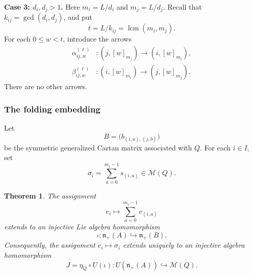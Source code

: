 \documentclass[12pt,reqno]{amsart}
\numberwithin{equation}{section}
\newtheorem{theorem}{Theorem}[section]
\theoremstyle{definition}
\theoremstyle{remark}
\newcommand{\lcm}{\operatorname{lcm}}
\theoremstyle{plain}
\theoremstyle{plain}
\begin{document}
\par\smallskip
\noindent\textbf{Case 3: $d_i,d_j>1$.}
Here $m_i=L/d_i$ and $m_j=L/d_j$. Recall that $k_{ij}=\gcd(d_i,d_j)$, and put
\[
t=L/k_{ij}=\lcm(m_i,m_j).
\]
For each $0\le w<t$, introduce the arrows
\begin{equation}\label{eq:auxiliary-long-arrows}
\begin{aligned}
    \alpha^{(\ell)}_{ij,w}&\colon
    (j,[w]_{m_j})\longrightarrow(i,[w]_{m_i}),\\
    \beta^{(\ell)}_{ij,w}&\colon
    (i,[w]_{m_i})\longrightarrow(j,[w]_{m_j}).
\end{aligned}
\end{equation}
There are no other arrows.

\subsubsection{The folding embedding}

Let
\[
    B=\bigl(b_{(i,a),(j,b)}\bigr)
\]
be the symmetric generalized Cartan matrix associated with $Q$.
For each $i\in I$, set
\[
    \sigma_i=\sum_{a=0}^{m_i-1}s_{(i,a)}
    \in\mathcal M(Q).
\]

\begin{theorem}\label{thm:auxiliary-embedding}
The assignment
\[
    e_i\longmapsto\sum_{a=0}^{m_i-1}e_{(i,a)}
\]
extends to an injective Lie algebra homomorphism
\[
    \iota\colon
    \mathfrak n_+(A)\hookrightarrow\mathfrak n_+(B).
\]
Consequently, the assignment $e_i\mapsto\sigma_i$
extends uniquely to an injective algebra homomorphism
\[
    J=\eta_Q\circ U(\iota)\colon
    U(\mathfrak n_+(A))\hookrightarrow\mathcal M(Q).
\]
\end{theorem}
\end{document}
